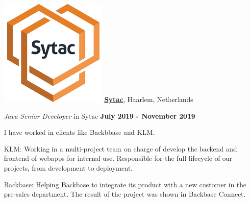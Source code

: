 \includegraphics[scale=0.1]{companies/sytac} \href{https://www.sytac.op/}{\textbf{Sytac}},
Haarlem, Netherlands
\begin{outerlist}
\item[] \textit{Java Senior Developer} in Sytac%
        \hfill \textbf{July 2019 - November 2019}

I have worked in clients like Backbbase and KLM\@.
\begin{innerlist}
\item KLM: Working in a multi-project team on charge of develop the backend and frontend of webapps for internal use. Responsible for the full lifecycle of our projects, from development to deployment.

\item Backbase: Helping Backbase to integrate its product with a new customer in the pre-sales department. The result of the project was shown in Backbase Connect.

\end{innerlist}

\end{outerlist}

